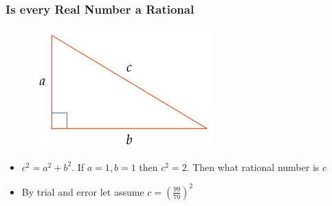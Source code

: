 \documentclass{beamer}
\begin{document}
\begin{frame}
    \frametitle{Is every Real Number a Rational}
    \begin{figure}[h]    
        \begin{minipage}[b]{0.8\textwidth}
        \centering
        \includegraphics[scale=0.35]{irrational-geometry.png}
        \end{minipage}
    \end{figure}
    \begin{itemize}
        \item \( c^{2} = a^{2} + b^{2} \). If \( a = 1, b = 1\) then \(c^{2} = 2 \). Then what rational number is \( c \)
        \item By trial and error let assume \( c = \left( \frac{99}{70} \right)^{2} \)
    \end{itemize} 
\end{frame}
\end{document}
